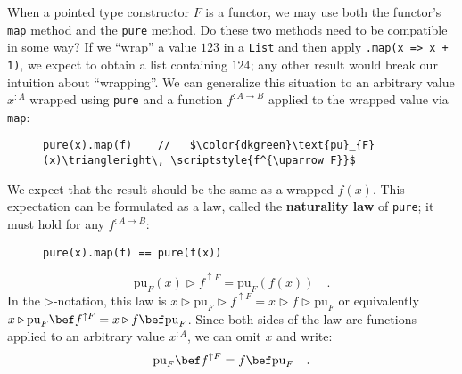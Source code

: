 \noindent When a pointed type constructor $F$ is a functor, we may
use both the functor\textsf{'}s \lstinline!map! method and the \lstinline!pure!
method. Do these two methods need to be compatible in some way? If
we \textsf{``}wrap\textsf{''} a value $123$ in a \lstinline!List! and then apply
\lstinline!.map(x => x + 1)!, we expect to obtain a list containing
$124$; any other result would break our intuition about \textsf{``}wrapping\textsf{''}.
We can generalize this situation to an arbitrary value $x^{:A}$ wrapped
using \lstinline!pure! and a function $f^{:A\rightarrow B}$ applied
to the wrapped value via \lstinline!map!:

\begin{wrapfigure}{l}{0.41\columnwidth}%
\vspace{-0.8\baselineskip}
\begin{lstlisting}[mathescape=true]
pure(x).map(f)    //   $\color{dkgreen}\text{pu}_{F}(x)\triangleright\, \scriptstyle{f^{\uparrow F}}$
\end{lstlisting}
\vspace{-0.8\baselineskip}
\end{wrapfigure}%

\noindent We expect that the result should be the same as a wrapped
$f(x)$. This expectation can be formulated as a law, called the \textbf{naturality
law} of \lstinline!pure!;
it must hold for any $f^{:A\rightarrow B}$:

\begin{wrapfigure}{l}{0.4\columnwidth}%
\vspace{-0.8\baselineskip}
\begin{lstlisting}
pure(x).map(f) == pure(f(x))
\end{lstlisting}
\vspace{-0.5\baselineskip}
\end{wrapfigure}%

\noindent \vspace{-0.5\baselineskip}
\[
\text{pu}_{F}(x)\triangleright f^{\uparrow F}=\text{pu}_{F}(f(x))\quad.
\]
In the $\triangleright$-notation, this law is $x\triangleright\text{pu}_{F}\triangleright f^{\uparrow F}=x\triangleright f\triangleright\text{pu}_{F}$
or equivalently $x\triangleright\text{pu}_{F}\bef f^{\uparrow F}=x\triangleright f\bef\text{pu}_{F}$.
Since both sides of the law are functions applied to an arbitrary
value $x^{:A}$, we can omit $x$ and write:
\begin{equation}
\text{pu}_{F}\bef f^{\uparrow F}=f\bef\text{pu}_{F}\quad.\label{eq:naturality-law-of-pure}
\end{equation}

